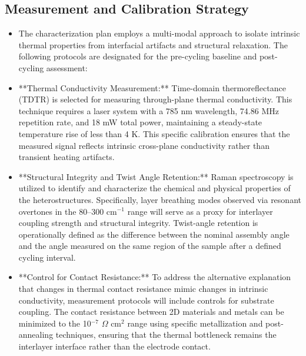 \documentclass[conference]{IEEEtran}
\begin{document}
\subsection{Measurement and Calibration Strategy}
\begin{itemize}
\item The characterization plan employs a multi-modal approach to isolate intrinsic thermal properties from interfacial artifacts and structural relaxation. The following protocols are designated for the pre-cycling baseline and post-cycling assessment:
\item **Thermal Conductivity Measurement:** Time-domain thermoreflectance (TDTR) is selected for measuring through-plane thermal conductivity. This technique requires a laser system with a 785 nm wavelength, 74.86 MHz repetition rate, and 18 mW total power, maintaining a steady-state temperature rise of less than 4 K. This specific calibration ensures that the measured signal reflects intrinsic cross-plane conductivity rather than transient heating artifacts.
\item **Structural Integrity and Twist Angle Retention:** Raman spectroscopy is utilized to identify and characterize the chemical and physical properties of the heterostructures. Specifically, layer breathing modes observed via resonant overtones in the 80--300 cm$^{-1}$ range will serve as a proxy for interlayer coupling strength and structural integrity. Twist-angle retention is operationally defined as the difference between the nominal assembly angle and the angle measured on the same region of the sample after a defined cycling interval.
\item **Control for Contact Resistance:** To address the alternative explanation that changes in thermal contact resistance mimic changes in intrinsic conductivity, measurement protocols will include controls for substrate coupling. The contact resistance between 2D materials and metals can be minimized to the 10$^{-7}$ $\Omega$ cm$^{2}$ range using specific metallization and post-annealing techniques, ensuring that the thermal bottleneck remains the interlayer interface rather than the electrode contact.
\end{itemize}~\cite{cite_26ecaf73d88dfe33,cite_c8ce7e25ee0b4157}
\end{document}
